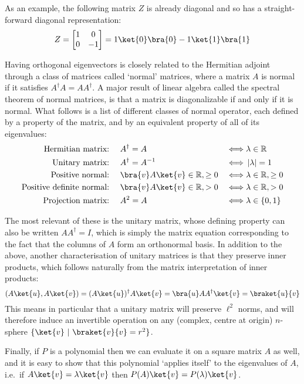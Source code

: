 As an example, the following matrix $Z$ is already diagonal and so has a straight-forward diagonal representation:
\begin{align*}
	Z = \left[\begin{matrix}
		1&0\\
		0&-1
	\end{matrix}\right] = 1\ket{0}\bra{0} - 1\ket{1}\bra{1}
\end{align*}

Having orthogonal eigenvectors is closely related to the Hermitian adjoint through a class of matrices called `normal' matrices, where a matrix $A$ is normal if it satisfies $A^\dagger A = AA^\dagger$. A major result of linear algebra called the spectral theorem of normal matrices, is that a matrix is diagonalizable if and only if it is normal. What follows is a list of different classes of normal operator, each defined by a property of the matrix, and by an equivalent property of all of its eigenvalues:
\begin{align*}
	\text{Hermitian matrix:\ }&&& A^\dagger = A & \iff& \lambda \in \mathbb{R} \\
	\text{Unitary matrix:\ }&&& A^\dagger = A^{-1} & \iff& \ord{\lambda}=1 \\
	\text{Positive normal:\ }&&& \bra{v}A\ket{v} \in \mathbb{R}, \geq 0 & \iff& \lambda \in \mathbb{R}, \geq 0 \\
	\text{Positive definite normal:\ }&&& \bra{v}A\ket{v} \in \mathbb{R}, > 0 & \iff& \lambda \in \mathbb{R}, > 0 \\
	\text{Projection matrix:\ }&&& A^2 = A & \iff& \lambda \in \{0, 1\} \\
\end{align*}

The most relevant of these is the unitary matrix, whose defining property can also be written $AA^\dagger = I$, which is simply the matrix equation corresponding to the fact that the columns of $A$ form an orthonormal basis. In addition to the above, another characterisation of unitary matrices is that they preserve inner products, which follows naturally from the matrix interpretation of inner products:
\[(A\ket{u}, A\ket{v}) = (A\ket{u})^\dagger A\ket{v} = \bra{u}AA^\dagger \ket{v} = \braket{u}{v}\]
This means in particular that a unitary matrix will preserve $\ell^2$ norms, and will therefore induce an invertible operation on any (complex, centre at origin) $n$-sphere $\{\ket{v}\ |\ \braket{v}{v} = r^2\}$.

Finally, if $P$ is a polynomial then we can evaluate it on a square matrix $A$ as well, and it is easy to show that this polynomial `applies itself' to the eigenvalues of $A$, i.e.\ if $A\ket{v} = \lambda\ket{v}$ then $P(A)\ket{v} = P(\lambda)\ket{v}$.

